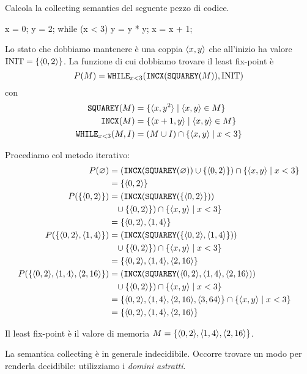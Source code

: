 \begin{example}\label{example:collecting}
Calcola la collecting semantics del seguente pezzo di codice.
\begin{javascriptcode}
x = 0;
y = 2;
while (x < 3) {
    y = y * y;
    x = x + 1;
}
\end{javascriptcode}
Lo stato che dobbiamo mantenere è una coppia $\langle x,y \rangle$ che all'inizio ha valore $\mathrm{INIT} = \{ \langle 0, 2 \rangle \}$. La funzione di cui dobbiamo trovare il least fix-point è
\[ P(M) = \texttt{WHILE}_{x<3}(\texttt{INCX}(\texttt{SQUAREY}(M)), \mathrm{INIT}) \]
con 
\begin{align*}
    \texttt{SQUAREY}(M) &= \{ \langle x,y^2 \rangle \mid \langle x,y \rangle \in M \} \\
    \texttt{INCX}(M) &= \{ \langle x+1,y \rangle \mid \langle x,y \rangle \in M \} \\
    \texttt{WHILE}_{x<3}(M, I) &= (M \cup I) \cap \{ \langle x,y \rangle \mid x < 3 \} 
\end{align*}

Procediamo col metodo iterativo:
\begin{align*}
    P(\varnothing) 
        &= (\texttt{INCX}(\texttt{SQUAREY}(\varnothing)) 
        \cup \{ \langle 0, 2 \rangle \} ) 
        \cap \{ \langle x,y \rangle \mid x < 3 \} \\
        &= \{ \langle 0, 2 \rangle \} \\
    P(\{ \langle 0, 2 \rangle \}) 
        &= (\texttt{INCX}(\texttt{SQUAREY}(\{ \langle 0, 2 \rangle \})) \\
        &\hphantom{=} \cup \{ \langle 0, 2 \rangle \} ) 
        \cap \{ \langle x,y \rangle \mid x < 3 \} \\
        &= \{ \langle 0, 2 \rangle,  \langle 1, 4 \rangle \} \\
    P(\{ \langle 0, 2 \rangle,  \langle 1, 4 \rangle \}) 
        &= (\texttt{INCX}(\texttt{SQUAREY}(\{ \langle 0, 2 \rangle,  \langle 1, 4 \rangle \})) \\
        &\hphantom{=} \cup \{ \langle 0, 2 \rangle \} ) 
        \cap \{ \langle x,y \rangle \mid x < 3 \} \\
        &= \{ \langle 0, 2 \rangle,  \langle 1, 4 \rangle, \langle 2, 16 \rangle \} \\
    P(\{ \langle 0, 2 \rangle,  \langle 1, 4 \rangle, \langle 2, 16 \rangle \} ) 
        &= (\texttt{INCX}(\texttt{SQUAREY}(\langle 0, 2 \rangle,  \langle 1, 4 \rangle, \langle 2, 16 \rangle)) \\
        &\hphantom{=} \cup \{ \langle 0, 2 \rangle \} ) 
        \cap \{ \langle x,y \rangle \mid x < 3 \} \\
        &= \{ \langle 0, 2 \rangle,  \langle 1, 4 \rangle, \langle 2, 16 \rangle, \langle 3, 64 \rangle \}
        \cap \{ \langle x,y \rangle \mid x < 3 \} \\
        &= \{ \langle 0, 2 \rangle,  \langle 1, 4 \rangle, \langle 2, 16 \rangle \}
\end{align*}

Il least fix-point è il valore di memoria $M = \{ \langle 0, 2 \rangle,  \langle 1, 4 \rangle, \langle 2, 16 \rangle \}$.
\end{example}

La semantica collecting è in generale indecidibile. Occorre trovare un modo per renderla decidibile: utilizziamo i \emph{domini astratti}.




